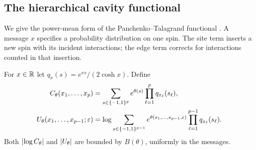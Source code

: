 \subsection{The hierarchical cavity functional}

We give the power-mean form of the Panchenko--Talagrand functional
\cite[Section~5]{PT04}. A message $x$ specifies a probability distribution
on one spin. The site term inserts a new spin with its incident
interactions; the edge term corrects for interactions counted in that
insertion.

For $x\in\mathbb R$ let $q_x(s)=e^{xs}/(2\cosh x)$. Define
\begin{align}
 C_\theta(x_1,\ldots,x_p)
 &=\sum_{s\in\{-1,1\}^p}e^{\theta(s)}\prod_{\ell=1}^p q_{x_\ell}(s_\ell),
 \label{model:edge}\\
 U_\theta(x_1,\ldots,x_{p-1};\varepsilon)
 &=\log\sum_{s\in\{-1,1\}^{p-1}}
 e^{\theta(s_1,\ldots,s_{p-1},\varepsilon)}
 \prod_{\ell=1}^{p-1}q_{x_\ell}(s_\ell).
 \label{model:site-message}
\end{align}
Both $\lvert\log C_\theta\rvert$ and $\lvert U_\theta\rvert$ are bounded by $B(\theta)$,
uniformly in the messages.

